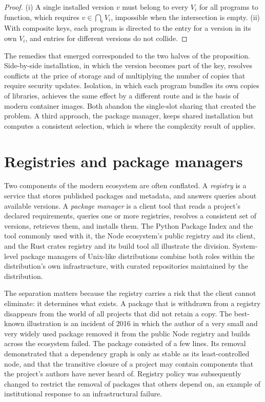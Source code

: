 \documentclass[11pt,twoside,openright]{book}
\theoremstyle{plain}
\theoremstyle{definition}
\theoremstyle{remark}
\begin{document}
\begin{proof}
(i) A single installed version $v$ must belong to every $V_i$ for all programs to function, which requires $v\in\bigcap_i V_i$, impossible when the intersection is empty. (ii) With composite keys, each program is directed to the entry for a version in its own $V_i$, and entries for different versions do not collide.
\end{proof}

The remedies that emerged corresponded to the two halves of the proposition. Side-by-side installation, in which the version becomes part of the key, resolves conflicts at the price of storage and of multiplying the number of copies that require security updates. Isolation, in which each program bundles its own copies of libraries, achieves the same effect by a different route and is the basis of modern container images. Both abandon the single-slot sharing that created the problem. A third approach, the package manager, keeps shared installation but computes a consistent selection, which is where the complexity result of  applies.

\section{Registries and package managers}

Two components of the modern ecosystem are often conflated. A \emph{registry} is a service that stores published packages and metadata, and answers queries about available versions. A \emph{package manager} is a client tool that reads a project's declared requirements, queries one or more registries, resolves a consistent set of versions, retrieves them, and installs them. The Python Package Index and the tool commonly used with it, the Node ecosystem's public registry and its client, and the Rust crates registry and its build tool all illustrate the division. System-level package managers of Unix-like distributions combine both roles within the distribution's own infrastructure, with curated repositories maintained by the distribution.

The separation matters because the registry carries a risk that the client cannot eliminate: it determines what exists. A package that is withdrawn from a registry disappears from the world of all projects that did not retain a copy. The best-known illustration is an incident of 2016 in which the author of a very small and very widely used package removed it from the public Node registry and builds across the ecosystem failed. The package consisted of a few lines. Its removal demonstrated that a dependency graph is only as stable as its least-controlled node, and that the transitive closure of a project may contain components that the project's authors have never heard of. Registry policy was subsequently changed to restrict the removal of packages that others depend on, an example of institutional response to an infrastructural failure.
\end{document}
